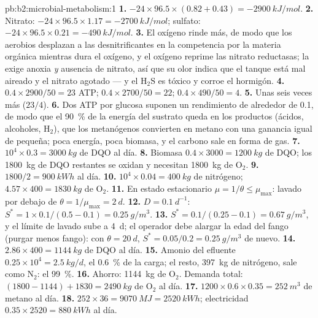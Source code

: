 \begin{solution}{pb:b2:microbial-metabolism:1}
\textbf{1.} $-24\times 96.5\times (0.82 + 0.43) = \qty{-2900}{kJ/mol}$.
\textbf{2.} Nitrato: $-24\times 96.5\times 1.17 = \qty{-2700}{kJ/mol}$;
sulfato: $-24\times 96.5\times 0.21 = \qty{-490}{kJ/mol}$.
\textbf{3.} El oxígeno rinde más, de modo que los aerobios desplazan a
las desnitrificantes en la competencia por la materia orgánica mientras
dura el oxígeno, y el oxígeno reprime las nitrato reductasas; la
 exige anoxia \emph{y} ausencia de nitrato, así que
su olor indica que el tanque está mal aireado y el nitrato agotado --- y
el $\mathrm{H_2S}$ es tóxico y corroe el hormigón.
\textbf{4.} $0.4\times 2900/50 = 23$ ATP; $0.4\times 2700/50 = 22$;
$0.4\times 490/50 = 4$.
\textbf{5.} Unas seis veces más ($23/4$).
\textbf{6.} Dos ATP por glucosa suponen un rendimiento de alrededor de
\num{0.1}, de modo que el \qty{90}{\%} de la energía del sustrato queda
en los productos (ácidos, alcoholes, $\mathrm{H_2}$), que los metanógenos
convierten en metano con una ganancia igual de pequeña; poca energía,
poca biomasa, y el carbono sale en forma de gas.
\textbf{7.} $10^4\times 0.3 = \qty{3000}{kg}$ de DQO al día.
\textbf{8.} Biomasa $0.4\times 3000 = \qty{1200}{kg}$ de DQO; los
\qty{1800}{kg} de DQO restantes se oxidan y necesitan \qty{1800}{kg}
de $\mathrm{O_2}$.
\textbf{9.} $1800/2 = \qty{900}{kWh}$ al día.
\textbf{10.} $10^4\times 0.04 = \qty{400}{kg}$ de nitrógeno;
$4.57\times 400 = \qty{1830}{kg}$ de $\mathrm{O_2}$.
\textbf{11.} En estado estacionario $\mu = 1/\theta \le \mu_{\max}$:
lavado por debajo de $\theta = 1/\mu_{\max} = \qty{2}{d}$.
\textbf{12.} $D = \qty{0.1}{d^{-1}}$: $S^* = 1\times 0.1/(0.5 - 0.1)
= \qty{0.25}{g/m^3}$.
\textbf{13.} $S^* = 0.1/(0.25 - 0.1) = \qty{0.67}{g/m^3}$, y el
límite de lavado sube a \qty{4}{d}; el operador debe alargar la edad
del fango (purgar menos fango): con $\theta = \qty{20}{d}$, $S^* =
0.05/0.2 = \qty{0.25}{g/m^3}$ de nuevo.
\textbf{14.} $2.86\times 400 = \qty{1144}{kg}$ de DQO al día.
\textbf{15.} Amonio del efluente $0.25\times 10^4 = \qty{2.5}{kg/d}$,
el \qty{0.6}{\%} de la carga; el resto, \qty{397}{kg} de nitrógeno,
sale como $\mathrm{N_2}$: el \qty{99}{\%}.
\textbf{16.} Ahorro: \qty{1144}{kg} de $\mathrm{O_2}$. Demanda total:
$(1800 - 1144) + 1830 = \qty{2490}{kg}$ de $\mathrm{O_2}$ al día.
\textbf{17.} $1200\times 0.6\times 0.35 = \qty{252}{m^3}$ de metano
al día.
\textbf{18.} $252\times 36 = \qty{9070}{MJ} = \qty{2520}{kWh}$;
electricidad $0.35\times 2520 = \qty{880}{kWh}$ al día.

\end{solution}
